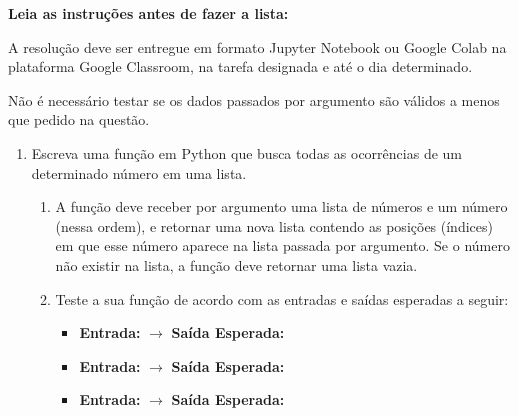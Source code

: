 
\vspace{1cm}

\noindent  \textbf{Leia as instruções antes de fazer a lista:}

\vspace{0.3cm}
\noindent A resolução deve ser entregue em formato Jupyter Notebook ou Google Colab na plataforma Google Classroom, na tarefa designada e até o dia determinado.

\noindent  Não é necessário testar se os dados passados por argumento são válidos a menos que pedido na questão.


\vspace{0.5cm}


\begin{enumerate}[label=\textbf{Q\arabic*.}]



    \item Escreva uma função em Python que busca todas as ocorrências de um determinado número em uma lista.
    \begin{enumerate}[label=\alph*)]
        \item A função deve receber por argumento uma lista de números e um número (nessa ordem), e retornar uma nova lista contendo as posições (índices) em que esse número aparece na lista passada por argumento. Se o número não existir na lista, a função deve retornar uma lista vazia.
        \item Teste a sua função de acordo com as entradas e saídas esperadas a seguir:
        \begin{itemize}
            \item \textbf{Entrada:}  $\rightarrow$ \textbf{Saída Esperada:} \code{[1, 3, 5]}
            \item \textbf{Entrada:}  $\rightarrow$ \textbf{Saída Esperada:} \code{[]}
            \item \textbf{Entrada:}  $\rightarrow$ \textbf{Saída Esperada:} \code{[]}
        \end{itemize}
    \end{enumerate}

    \vspace{0.5cm}

    


\end{enumerate}
